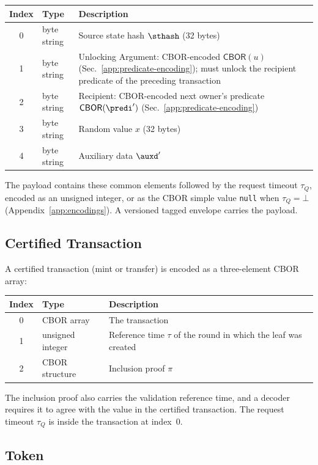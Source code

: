 \begin{longtable}{clp{10cm}}
\textbf{Index} & \textbf{Type} & \textbf{Description} \\
\hline
0 & byte string & Source state hash $\sthash$ (32 bytes) \\
1 & byte string & Unlocking Argument: CBOR-encoded $\mathsf{CBOR}(u)$ (Sec.~\ref{app:predicate-encoding}); must unlock the recipient predicate of the preceding transaction \\
2 & byte string & Recipient: CBOR-encoded next owner's predicate $\mathsf{CBOR}(\predi')$ (Sec.~\ref{app:predicate-encoding}) \\
3 & byte string & Random value $x$ (32 bytes) \\
4 & byte string & Auxiliary data $\auxd'$ \\
\end{longtable}

The payload contains these common elements followed by the request timeout $\tau_Q$, encoded as an unsigned integer, or as the CBOR simple value \texttt{null} when $\tau_Q=\bot$ (Appendix~\ref{app:encodings}). A versioned tagged envelope carries the payload.


\subsection{Certified Transaction}

A certified transaction (mint or transfer) is encoded as a three-element CBOR array:

\begin{longtable}{clp{8cm}}
\textbf{Index} & \textbf{Type} & \textbf{Description} \\
\hline
0 & CBOR array & The transaction \\
1 & unsigned integer & Reference time $\tau$ of the round in which the leaf was created \\
2 & CBOR structure & Inclusion proof $\pi$ \\
\end{longtable}

The inclusion proof also carries the validation reference time, and a decoder requires it to agree with the value in the certified transaction. The request timeout $\tau_Q$ is inside the transaction at index~0.


\subsection{Token}

